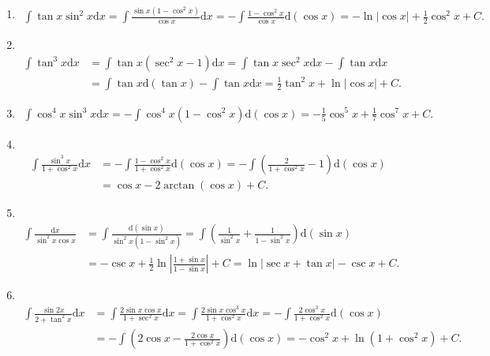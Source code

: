 \begin{solution}
\begin{enumerate}
    \item[25.]
    \[
    \begin{aligned}
    \int\tan{x}\sin^2{x}\mathrm{d}x=\int\frac{\sin{x}(1-\cos^2{x})}{\cos{x}}\mathrm{d}x=-\int\frac{1-\cos^2{x}}{\cos{x}}\mathrm{d}(\cos{x})=-\ln\left|\cos{x}\right|+\frac{1}{2}\cos^2{x}+C.
    \end{aligned}
    \]

    \item[26.]\\
    \[
    \begin{aligned}
    \int\tan^3{x}\mathrm{d}x&=\int\tan{x}(\sec^2{x}-1)\mathrm{d}x=\int\tan{x}\sec^2{x}\mathrm{d}x-\int\tan{x}\mathrm{d}x\\
    &=\int\tan{x}\mathrm{d}(\tan{x})-\int\tan{x}\mathrm{d}x=\frac{1}{2}\tan^2{x}+\ln\left|\cos{x}\right|+C.
    \end{aligned}
    \]

    \item[27.]
    \[
    \begin{aligned}
    \int\cos^4{x}\sin^3{x}\mathrm{d}x=-\int\cos^4{x}(1-\cos^2{x})\mathrm{d}(\cos{x})=-\frac{1}{5}\cos^5{x}+\frac{1}{7}\cos^7{x}+C.
    \end{aligned}
    \]

    \item[28.]\\
    \[
    \begin{aligned}
    \int\frac{\sin^3{x}}{1+\cos^2{x}}\mathrm{d}x&=-\int\frac{1-\cos^2{x}}{1+\cos^2{x}}\mathrm{d}(\cos{x})=-\int\left(\frac{2}{1+\cos^2{x}}-1\right)\mathrm{d}(\cos{x})\\
    &=\cos{x}-2\arctan\left(\cos{x}\right)+C.
    \end{aligned}
    \]

    \item[29.]\\
    \[
    \begin{aligned}
    \int\frac{\mathrm{d}x}{\sin^2{x}\cos{x}}&=\int\frac{\mathrm{d}(\sin{x})}{\sin^2{x}(1-\sin^2{x})}=\int\left(\frac{1}{\sin^2{x}}+\frac{1}{1-\sin^2{x}}\right)\mathrm{d}(\sin{x})\\
    &=-\csc{x}+\frac{1}{2}\ln\left|\frac{1+\sin{x}}{1-\sin{x}}\right|+C=\ln\left|\sec{x}+\tan{x}\right|-\csc{x}+C.
    \end{aligned}
    \]

    \item[30.]\\
    \[
    \begin{aligned}
    \int\frac{\sin{2x}}{2+\tan^2{x}}\mathrm{d}x&=\int\frac{2\sin{x}\cos{x}}{1+\sec^2{x}}\mathrm{d}x=\int\frac{2\sin{x}\cos^3{x}}{1+\cos^2{x}}\mathrm{d}x=-\int\frac{2\cos^3{x}}{1+\cos^2{x}}\mathrm{d}(\cos{x})\\
    &=-\int\left(2\cos{x}-\frac{2\cos{x}}{1+\cos^2{x}}\right)\mathrm{d}(\cos{x})=-\cos^2{x}+\ln\left(1+\cos^2{x}\right)+C.
    \end{aligned}
    \]


\end{enumerate}
\end{solution}
